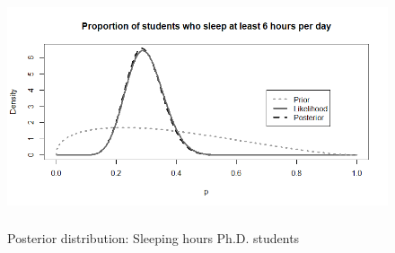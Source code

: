 \begin{enumerate}[leftmargin=*]
\begin{figure}[!h]
	\includegraphics[width=340pt, height=200pt]{Chapters/chapter4/figures/Sleep.png}
	\caption[List of figure caption goes here]{Posterior distribution: Sleeping hours Ph.D. students}\label{fig16}
\end{figure}


    
\end{enumerate}



